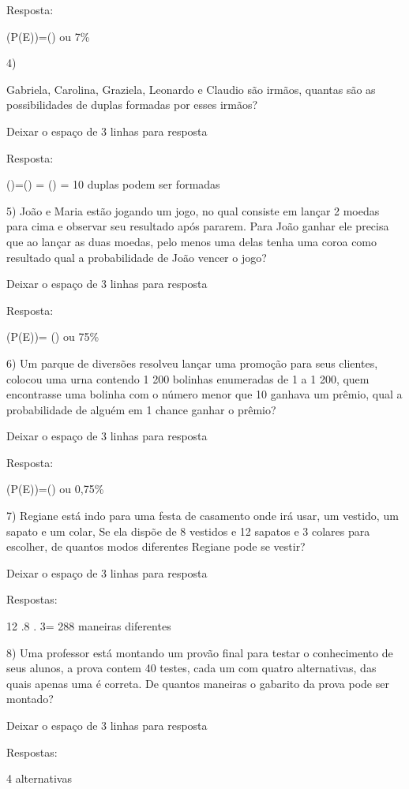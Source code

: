Resposta:

(P(E))=() ou 7\%

4)

Gabriela, Carolina, Graziela, Leonardo e Claudio são irmãos, quantas são
as possibilidades de duplas formadas por esses irmãos?

Deixar o espaço de 3 linhas para resposta

Resposta:

()=() = () = 10
duplas podem ser formadas

5) João e Maria estão jogando um jogo, no qual consiste em lançar 2
moedas para cima e observar seu resultado após pararem. Para João ganhar
ele precisa que ao lançar as duas moedas, pelo menos uma delas tenha uma
coroa como resultado qual a probabilidade de João vencer o jogo?

Deixar o espaço de 3 linhas para resposta

Resposta:

(P(E))= () ou 75\%

6) Um parque de diversões resolveu lançar uma promoção para seus
clientes, colocou uma urna contendo 1 200 bolinhas enumeradas de 1 a 1
200, quem encontrasse uma bolinha com o número menor que 10 ganhava um
prêmio, qual a probabilidade de alguém em 1 chance ganhar o prêmio?

Deixar o espaço de 3 linhas para resposta

Resposta:

(P(E))=() ou 0,75\%

7) Regiane está indo para uma festa de casamento onde irá usar, um
vestido, um sapato e um colar, Se ela dispõe de 8 vestidos e 12 sapatos
e 3 colares para escolher, de quantos modos diferentes Regiane pode se
vestir?

Deixar o espaço de 3 linhas para resposta

Respostas:

12 .8 . 3= 288 maneiras diferentes

8) Uma professor está montando um provão final para testar o
conhecimento de seus alunos, a prova contem 40 testes, cada um com
quatro alternativas, das quais apenas uma é correta. De quantos maneiras
o gabarito da prova pode ser montado?

Deixar o espaço de 3 linhas para resposta

Respostas:

4 alternativas

